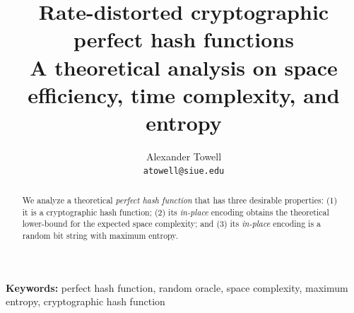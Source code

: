 \documentclass[hidelinks,11pt,final]{article}
\title
{
    Rate-distorted cryptographic perfect hash functions\\
    \large A theoretical analysis on space efficiency, time complexity, and entropy
}
\author
{
    Alexander Towell\\
    \texttt{atowell@siue.edu}
}
\date{}
\begin{document}
\maketitle
\begin{abstract}
We analyze a theoretical \emph{perfect hash function} that has three desirable properties: (1) it is a cryptographic hash function; (2) its \emph{in-place} encoding obtains the theoretical lower-bound for the expected space complexity; and (3) its \emph{in-place} encoding is a random bit string with maximum entropy.
\end{abstract}

\textbf{Keywords:} perfect hash function,
        random oracle, space complexity,
        maximum entropy, cryptographic hash function

\tableofcontents

\printglossary[type=symbols,style=list,nogroupskip]
\printglossary[type=\acronymtype]








\printglossary




\end{document}
